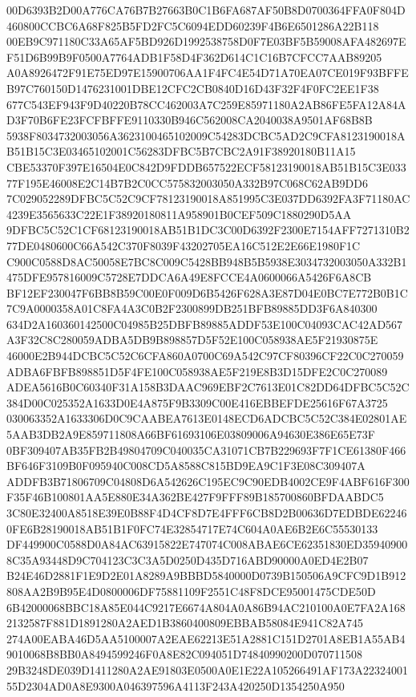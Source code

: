 \documentclass[UTF8,fontset=fandol,zihao=-4,a4paper]{ctexart}
\begin{document}
{{00D6393B2D00A776CA76B7B27663B0C1B6FA687AF50B8D0700364FFA0F804D460800CCBC6A68F825B5FD2FC5C6094EDD60239F4B6E6501286A22B118
00EB9C971180C33A65AF5BD926D1992538758D0F7E03BF5B59008AFA482697EF51D6B99B9F0500A7764ADB1F58D4F362D614C1C16B7CFCC7AAB89205
A0A8926472F91E75ED97E15900706AA1F4FC4E54D71A70EA07CE019F93BFFEB97C760150D1476231001DBE12CFC2CB0840D16D43F32F4F0FC2EE1F38
677C543EF943F9D40220B78CC462003A7C259E85971180A2AB86FE5FA12A84AD3F70B6FE23FCFBFFE9110330B946C562008CA2040038A9501AF68B8B
5938F8034732003056A3623100465102009C54283DCBC5AD2C9CFA8123190018AB51B15C3E03465102001C56283DFBC5B7CBC2A91F38920180B11A15
CBE53370F397E16504E0C842D9FDDB657522ECF58123190018AB51B15C3E03377F195E46008E2C14B7B2C0CC575832003050A332B97C068C62AB9DD6
7C029052289DFBC5C52C9CF78123190018A851995C3E037DD6392FA3F71180AC4239E3565633C22E1F38920180811A958901B0CEF509C1880290D5AA
9DFBC5C52C1CF68123190018AB51B1DC3C00D6392F2300E7154AFF7271310B277DE0480600C66A542C370F8039F43202705EA16C512E2E66E1980F1C
C900C0588D8AC50058E7BC8C009C5428BB948B5B5938E3034732003050A332B1475DFE957816009C5728E7DDCA6A49E8FCCE4A0600066A5426F6A8CB
BF12EF230047F6BB8B59C00E0F009D6B5426F628A3E87D04E0BC7E772B0B1C7C9A0000358A01C8FA4A3C0B2F2300899DB251BFB89885DD3F6A840300
634D2A160360142500C04985B25DBFB89885ADDF53E100C04093CAC42AD567A3F32C8C280059ADBA5DB9B898857D5F52E100C058938AE5F21930875E
46000E2B944DCBC5C52C6CFA860A0700C69A542C97CF80396CF22C0C270059ADBA6FBFB898851D5F4FE100C058938AE5F219E8B3D15DFE2C0C270089
ADEA5616B0C60340F31A158B3DAAC969EBF2C7613E01C82DD64DFBC5C52C384D00C025352A1633D0E4A875F9B3309C00E416EBBEFDE25616F67A3725
030063352A1633306D0C9CAABEA7613E0148ECD6ADCBC5C52C384E02801AE5AAB3DB2A9E859711808A66BF61693106E03809006A94630E386E65E73F
0BF309407AB35FB2B49804709C040035CA31071CB7B229693F7F1CE61380F466BF646F3109B0F095940C008CD5A8588C815BD9EA9C1F3E08C309407A
ADDFB3B71806709C04808D6A542626C195EC9C90EDB4002CE9F4ABF616F300F35F46B100801AA5E880E34A362BE427F9FFF89B185700860BFDAABDC5
3C80E32400A8518E39E0B88F4D4CF8D7E4FFF6CB8D2B00636D7EDBDE622460FE6B28190018AB51B1F0FC74E32854717E74C604A0AE6B2E6C55530133
DF449900C0588D0A84AC63915822E747074C008ABAE6CE62351830ED359409008C35A93448D9C704123C3C3A5D0250D435D716ABD90000A0ED4E2B07
B24E46D2881F1E9D2E01A8289A9BBBD5840000D0739B150506A9CFC9D1B912808AA2B9B95E4D0800006DF75881109F2551C48F8DCE95001475CDE50D
6B42000068BBC18A85E044C9217E6674A804A0A86B94AC210100A0E7FA2A1682132587F881D1891280A2AED1B3860400809EBBAB58084E941C82A745
274A00EABA46D5AA5100007A2EAE62213E51A2881C151D2701A8EB1A55AB49010068B8BB0A8494599246F0A8E82C094051D74840990200D070711508
29B3248DE039D1411280A2AE91803E0500A0E1E22A105266491AF173A2232400155D2304AD0A8E9300A046397596A4113F243A420250D1354250A950
}}
\end{document}
